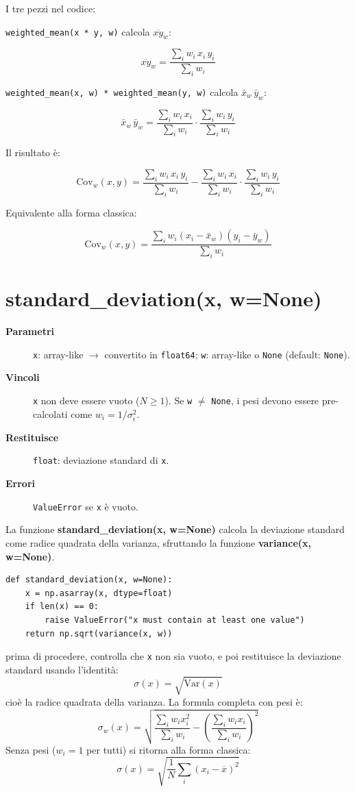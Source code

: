 I tre pezzi nel codice:

\texttt{weighted\_mean(x * y, w)} calcola $\overline{xy}_w$:

\[
\overline{xy}_w = \frac{\sum_i w_i \, x_i \, y_i}{\sum_i w_i}
\]

\texttt{weighted\_mean(x, w) * weighted\_mean(y, w)} calcola $\bar{x}_w \, \bar{y}_w$:

\[
\bar{x}_w \, \bar{y}_w = \frac{\sum_i w_i \, x_i}{\sum_i w_i} \cdot \frac{\sum_i w_i \, y_i}{\sum_i w_i}
\]

Il risultato è:

\[
\text{Cov}_w(x,y) = \frac{\sum_i w_i \, x_i \, y_i}{\sum_i w_i} - \frac{\sum_i w_i \, x_i}{\sum_i w_i} \cdot \frac{\sum_i w_i \, y_i}{\sum_i w_i}
\]

Equivalente alla forma classica:

\[
\text{Cov}_w(x,y) = \frac{\sum_i w_i (x_i - \bar{x}_w)(y_i - \bar{y}_w)}{\sum_i w_i}
\]

\newpage
\section{\texorpdfstring{standard\_deviation(x, w=None)}{standard\_deviation(x, w=None)}}
\label{sec:standard-deviation}
\begin{description}
  \item[\textbf{Parametri}]
    \texttt{x}: array-like $\to$ convertito in \texttt{float64};
    \texttt{w}: array-like o \texttt{None} (default: \texttt{None}).
  \item[\textbf{Vincoli}]
    \texttt{x} non deve essere vuoto ($N \geq 1$).
    Se \texttt{w} $\neq$ \texttt{None}, i pesi devono essere pre-calcolati come
    $w_i = 1/\sigma_i^2$.
  \item[\textbf{Restituisce}]
    \texttt{float}: deviazione standard di \texttt{x}.
  \item[\textbf{Errori}]
    \texttt{ValueError} se \texttt{x} è vuoto.
\end{description}
La funzione \textbf{standard\_deviation(x, w=None)} calcola la deviazione standard
come radice quadrata della varianza, sfruttando la funzione \textbf{variance(x, w=None)}.
\begin{verbatim}
def standard_deviation(x, w=None):
    x = np.asarray(x, dtype=float)
    if len(x) == 0:
        raise ValueError("x must contain at least one value")
    return np.sqrt(variance(x, w))
\end{verbatim}
prima di procedere, controlla che \texttt{x} non sia vuoto, e poi restituisce la
deviazione standard usando l'identità:
$$\sigma(x) = \sqrt{\text{Var}(x)}$$
cioè la radice quadrata della varianza. La formula completa con pesi è:
$$\sigma_w(x) = \sqrt{\frac{\sum_i w_i x_i^2}{\sum_i w_i} - \left( \frac{\sum_i w_i x_i}{\sum_i w_i} \right)^2}$$
\enlargethispage{2\baselineskip}
Senza pesi ($w_i = 1$ per tutti) si ritorna alla forma classica:
$$\sigma(x) = \sqrt{\frac{1}{N} \sum_i (x_i - \overline{x})^2}$$
